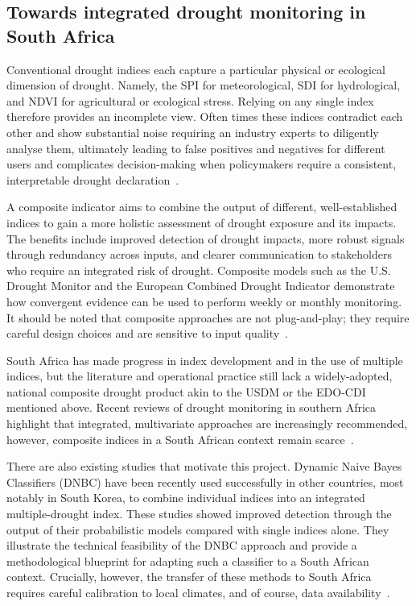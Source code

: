 \subsection{Towards integrated drought monitoring in South Africa}

Conventional drought indices each capture a particular physical or ecological dimension of drought. Namely, the SPI for meteorological, SDI for hydrological, and NDVI for agricultural or ecological stress. Relying on any single index therefore provides an incomplete view. Often times these indices contradict each other and show substantial noise requiring an industry experts to diligently analyse them, ultimately leading to false positives and negatives for different users and complicates decision-making when policymakers require a consistent, interpretable drought declaration~\cite{NCEI_2024}.

A composite indicator aims to combine the output of different, well-established indices to gain a more holistic assessment of drought exposure and its impacts. The benefits include improved detection of drought impacts, more robust signals through redundancy across inputs, and clearer communication to stakeholders who require an integrated risk of drought. Composite models such as the U.S. Drought Monitor and the European Combined Drought Indicator demonstrate how convergent evidence can be used to perform weekly or monthly monitoring. It should be noted that composite approaches are not plug-and-play; they require careful design choices and are sensitive to input quality~\cite{usdm,cdi,some_comp_indicator}.


South Africa has made progress in index development and in the use of multiple indices, but the literature and operational practice still lack a widely-adopted, national composite drought product akin to the USDM or the EDO-CDI mentioned above. Recent reviews of drought monitoring in southern Africa highlight that integrated, multivariate approaches are increasingly recommended, however, composite indices in a South African context remain scarce~\cite{za_drought_review, za_drought_review2}. 

There are also existing studies that motivate this project. Dynamic Naive Bayes Classifiers (DNBC) have been recently used successfully in other countries, most notably in South Korea, to combine individual indices into an integrated multiple-drought index. These studies showed improved detection through the output of their probabilistic models compared with single indices alone. They illustrate the technical feasibility of the DNBC approach and provide a methodological blueprint for adapting such a classifier to a South African context. Crucially, however, the transfer of these methods to South Africa requires careful calibration to local climates, and of course, data availability~\cite{dnbc_drought_second, dnbc_drought_first}.



